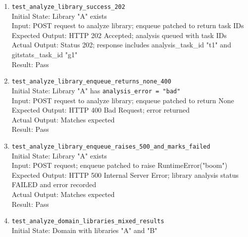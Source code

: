 \documentclass[12pt, titlepage]{article}
\begin{document}
\begin{enumerate}
      \\Input: RepoAnalyzer.run\_gitstats\_only raises RuntimeError
      \\Expected Output: Library gitstats\_status FAILED, error recorded, exception propagated
      \\Actual Output: Matches expected
      \\Result: Pass
    \item \texttt{test\_analyze\_library\_success\_202} \label{test-analyze-library-success-202}
      \\Initial State: Library "A" exists
      \\Input: POST request to analyze library; enqueue patched to return task IDs
      \\Expected Output: HTTP 202 Accepted; analysis queued with task IDs
      \\Actual Output: Status 202; response includes analysis\_task\_id "t1" and gitstats\_task\_id "g1"
      \\Result: Pass
    \item \texttt{test\_analyze\_library\_enqueue\_returns\_none\_400} \label{test-analyze-library-enqueue-returns-none-400}
      \\Initial State: Library "A" has \texttt{analysis\_error = "bad"}
      \\Input: POST request to analyze library; enqueue patched to return None
      \\Expected Output: HTTP 400 Bad Request; error returned
      \\Actual Output: Matches expected
      \\Result: Pass
    \item \texttt{test\_analyze\_library\_enqueue\_raises\_500\_and\_marks\_failed} \label{test-analyze-library-enqueue-raises-500-and-marks-failed}
      \\Initial State: Library "A" exists
      \\Input: POST request; enqueue patched to raise RuntimeError("boom")
      \\Expected Output: HTTP 500 Internal Server Error; library analysis status FAILED and error recorded
      \\Actual Output: Matches expected
      \\Result: Pass
    \item \texttt{test\_analyze\_domain\_libraries\_mixed\_results} \label{test-analyze-domain-libraries-mixed-results}
      \\Initial State: Domain with libraries "A" and "B"

\end{enumerate}
\end{document}
